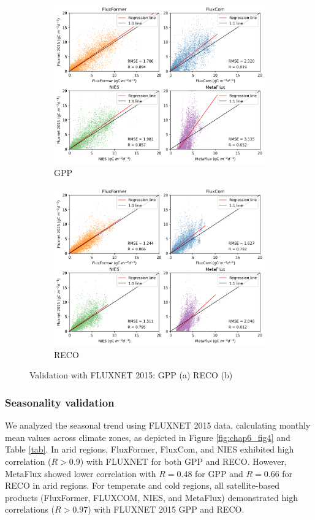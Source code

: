 \begin{figure}[p]
    \centering
    \begin{subfigure}{\textwidth}
      \centering
      \includegraphics[width=.8\textwidth]{figs/chap6/val_fluxnet_all_GPP.png}
      \caption{GPP}
      \label{fig:chap6_fig3a}
    \end{subfigure}

    \begin{subfigure}{\textwidth}
      \centering
      \includegraphics[width=.8\textwidth]{figs/chap6/val_fluxnet_all_RECO.png}
      \caption{RECO}
      \label{fig:chap6_fig3b}
    \end{subfigure}
    \caption[Validation with FLUXNET 2015]{Validation with FLUXNET 2015: GPP (a) RECO (b)}
    \label{fig:chap6_fig3}
\end{figure}
\subsubsection*{Seasonality validation}
We analyzed the seasonal trend using FLUXNET 2015 data, calculating monthly mean values across climate zones, as depicted in Figure \ref{fig:chap6_fig4} and Table \ref{tab}. In arid regions, FluxFormer, FluxCom, and NIES exhibited high correlation ($R > 0.9$) with FLUXNET for both GPP and RECO. However, MetaFlux showed lower correlation with $R=0.48$ for GPP and $R=0.66$ for RECO in arid regions. For temperate and cold regions, all satellite-based products (FluxFormer, FLUXCOM, NIES, and MetaFlux) demonstrated high correlations ($R>0.97$) with FLUXNET 2015 GPP and RECO. \par

